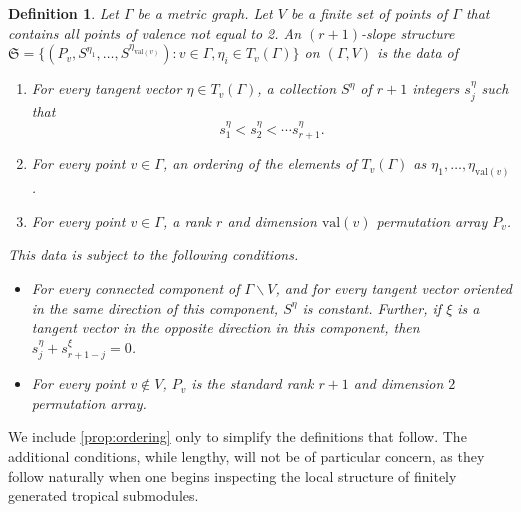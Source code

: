 \documentclass{amsart}
\makeatletter
\newtheorem{definition}[theorem]{Definition}
\def\namedlabel#1#2{\begingroup
	#2%
	\def\@currentlabel{#2}%
	\phantomsection\label{#1}\endgroup
}
\makeatother
\begin{document}
	\begin{definition}
		Let $\Gamma$ be a metric graph. Let $V$ be a finite set of points of $\Gamma$ that contains all points of valence not equal to 2. An $(r+1)$-slope structure $\mathfrak{S} = \{ (P_v, S^{\eta_1}, \ldots, S^{\eta_{\mathrm{val}(v)}}) : v \in \Gamma, \eta_{i} \in T_v(\Gamma) \}$ on $(\Gamma,V)$ is the data of
		\begin{enumerate}
			\item [\namedlabel{prop:tangent-vector}{(1)}] For every tangent vector $\eta \in T_v(\Gamma)$, a collection $S^\eta$ of $r+1$ integers $s_j^{\eta}$ such that $$s_1^{\eta} < s_2^{\eta} < \cdots s_{r+1}^{\eta}.$$ 
			\item [\namedlabel{prop:ordering}{(2)}] For every point $v \in \Gamma$, an ordering of the elements of $T_v(\Gamma)$ as $\eta_1, \ldots, \eta_{\mathrm{val}(v)}$.
			\item [\namedlabel{prop:perm-array}{(3)}] For every point $v \in \Gamma$, a rank $r$ and dimension $\mathrm{val}(v)$ permutation array $P_v$.
		\end{enumerate}
		
		This data is subject to the following conditions. 
		
		\begin{itemize}
			\item For every connected component of $\Gamma \backslash V$, and for every tangent vector oriented in the same direction of this component, $S^{\eta}$ is constant. Further, if $\xi$ is a tangent vector in the opposite direction in this component, then $s_j^{\eta} + s_{r+1-j}^{\xi} = 0$.
			\item For every point $v \not \in V$, $P_v$ is the standard rank $r+1$ and dimension $2$ permutation array.
		\end{itemize}
		
	\end{definition}
	
	We include \ref{prop:ordering} only to simplify the definitions that follow. The additional conditions, while lengthy, will not be of particular concern, as they follow naturally when one begins inspecting the local structure of finitely generated tropical submodules.
	
\end{document}
